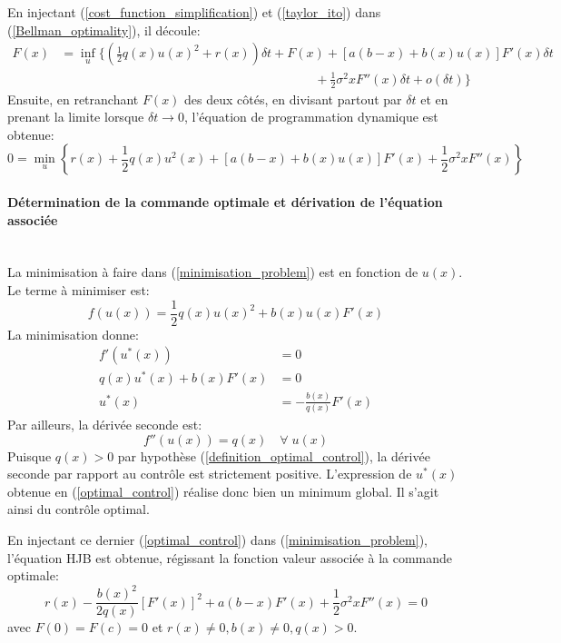 En injectant (\ref{cost_function_simplification}) et (\ref{taylor_ito}) dans (\ref{Bellman_optimality}), il découle:
\begin{equation}\label{initial_minimisation problem}
    \begin{aligned}
        F(x)&=\inf_u\Bigg\{\left(\frac{1}{2}q(x){u(x)}^2+r(x)\right)\delta t+F(x)+\left[a(b-x)+b(x)u(x)\right]F'(x)\delta t\\&\quad\quad\quad\quad\quad\quad\quad\quad\quad\quad\quad\quad\quad\quad\quad\quad\quad\quad\quad\quad+\frac{1}{2}\sigma^2xF''(x)\delta t+o(\delta t)\Bigg\}
    \end{aligned}
\end{equation}
Ensuite, en retranchant $F(x)$ des deux côtés, en divisant partout par $\delta t$ et en prenant la limite lorsque $\delta t\to0$, l'équation de programmation dynamique est obtenue:
\begin{equation}\label{minimisation_problem}
    0=\min_u\left\{r(x)+\frac{1}{2}q(x)u^2(x)+[a(b-x)+b(x)u(x)]F'(x)+\frac{1}{2}\sigma^2xF''(x)\right\}
\end{equation}
\paragraph{Détermination de la commande optimale et dérivation de l'équation associée}\phantom{}\\
La minimisation à faire dans (\ref{minimisation_problem}) est en fonction de $u(x)$. Le terme à minimiser est:
\[
f(u(x))=\frac{1}{2}q(x){u(x)}^2+b(x)u(x)F'(x)
\]
La minimisation donne:
\begin{equation}\label{optimal_control}
    \begin{aligned}
        f'(u^*(x))&=0\\
        q(x)u^*(x)+b(x)F'(x)&=0\\
    u^*(x)&=-\frac{b(x)}{q(x)}F'(x)
    \end{aligned}
\end{equation}
Par ailleurs, la dérivée seconde est: 
\[
f''(u(x))=q(x)\quad\forall\;u(x)
\]
Puisque \( q(x) > 0 \) par hypothèse (\ref{definition_optimal_control}), la dérivée seconde par rapport au contrôle est strictement positive. L'expression de \( u^*(x) \) obtenue en (\ref{optimal_control}) réalise donc bien un minimum global. Il s'agit ainsi du contrôle optimal.

En injectant ce dernier (\ref{optimal_control}) dans (\ref{minimisation_problem}), l'équation \acl{HJB} est obtenue, régissant la fonction valeur associée à la commande optimale:
\begin{equation}\label{control_equation}
    r(x) - \frac{{b(x)}^2}{2q(x)}{\left[F'(x)\right]}^2 + a(b - x)F'(x) + \frac{1}{2}\sigma^2 x F''(x) = 0
\end{equation}
avec $F(0)=F(c)=0$ et $r(x)\neq0, b(x)\neq0, q(x)>0$.


